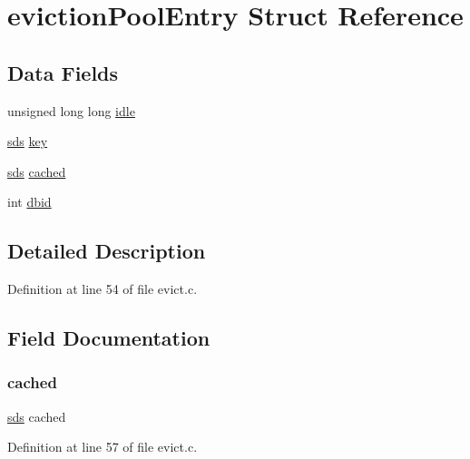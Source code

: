 \hypertarget{structeviction_pool_entry}{}\section{eviction\+Pool\+Entry Struct Reference}
\label{structeviction_pool_entry}
\subsection*{Data Fields}
\begin{DoxyCompactItemize}
\item 
unsigned long long \hyperlink{structeviction_pool_entry_a33e435ed79bd42a3e152e820d2fe9c59}{idle}
\item 
\hyperlink{sds_8h_ad69abac3df4532879db9642c95f5ef6f}{sds} \hyperlink{structeviction_pool_entry_a46666a67588d8b58e5f36934ee61ea81}{key}
\item 
\hyperlink{sds_8h_ad69abac3df4532879db9642c95f5ef6f}{sds} \hyperlink{structeviction_pool_entry_a065beeed34d1258c35467721dcdf6a67}{cached}
\item 
int \hyperlink{structeviction_pool_entry_adc62368127157e2b3ff9cabe77f4f337}{dbid}
\end{DoxyCompactItemize}


\subsection{Detailed Description}


Definition at line 54 of file evict.\+c.



\subsection{Field Documentation}
\mbox{\label{structeviction_pool_entry_a065beeed34d1258c35467721dcdf6a67}} 
\subsubsection{\texorpdfstring{cached}{cached}}
{\footnotesize\ttfamily \hyperlink{sds_8h_ad69abac3df4532879db9642c95f5ef6f}{sds} cached}



Definition at line 57 of file evict.\+c.

